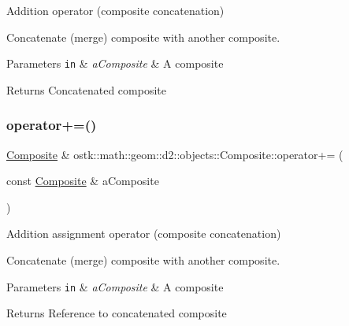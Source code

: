 Addition operator (composite concatenation) 

Concatenate (merge) composite with another composite.


\begin{DoxyParams}[1]{Parameters}
\mbox{\tt in}  & {\em a\+Composite} & A composite \\
\hline
\end{DoxyParams}
\begin{DoxyReturn}{Returns}
Concatenated composite 
\end{DoxyReturn}
\mbox{\label{classostk_1_1math_1_1geom_1_1d2_1_1objects_1_1_composite_aa8448f84e571728a00980eb449a34d46}} 
\subsubsection{\texorpdfstring{operator+=()}{operator+=()}}
{\footnotesize\ttfamily \hyperlink{classostk_1_1math_1_1geom_1_1d2_1_1objects_1_1_composite}{Composite} \& ostk\+::math\+::geom\+::d2\+::objects\+::\+Composite\+::operator+= (\begin{DoxyParamCaption}\item[{const \hyperlink{classostk_1_1math_1_1geom_1_1d2_1_1objects_1_1_composite}{Composite} \&}]{a\+Composite }\end{DoxyParamCaption})}



Addition assignment operator (composite concatenation) 

Concatenate (merge) composite with another composite.


\begin{DoxyParams}[1]{Parameters}
\mbox{\tt in}  & {\em a\+Composite} & A composite \\
\hline
\end{DoxyParams}
\begin{DoxyReturn}{Returns}
Reference to concatenated composite 
\end{DoxyReturn}
\mbox{\label{classostk_1_1math_1_1geom_1_1d2_1_1objects_1_1_composite_a5ac594c00468226620763b39bb7645a9}} 
